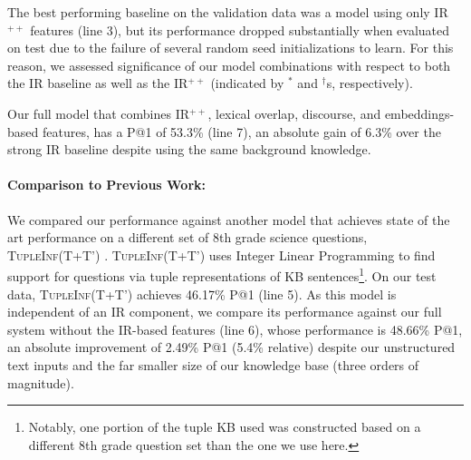The best performing baseline on the validation data was a model using only IR$^{++}$ features (line 3), but its performance dropped substantially when evaluated on test due to the failure of several random seed initializations to learn.  For this reason, we assessed significance of our model combinations with respect to both the IR baseline as well as the IR$^{++}$ (indicated by $^*$ and $^{\dagger}$s, respectively).

Our full model that combines IR$^{++}$, lexical overlap, discourse, and embeddings-based features, has a P@1 of 53.3\% (line 7), an absolute gain of 6.3\% over the strong IR baseline despite using the same background knowledge.  

\paragraph{Comparison to Previous Work:}
We compared our performance against another model that achieves state of the art performance on a different set of 8th grade science questions, \textsc{TupleInf}(T+T') \citep{khot2017tupleinf}.  \textsc{TupleInf}(T+T') uses Integer Linear Programming to find support for questions via tuple representations of KB sentences\footnote{Notably, one portion of the tuple KB used was constructed based on a different 8th grade question set than the one we use here.}.
On our test data, \textsc{TupleInf}(T+T') achieves 46.17\% P@1 (line 5). 
As this model is independent of an IR component, we compare its performance against our full system without the IR-based features (line 6), whose performance is 48.66\% P@1, an absolute improvement of 2.49\% P@1 (5.4\% relative) despite our unstructured text inputs and the far smaller size of our knowledge base (three orders of magnitude). 

